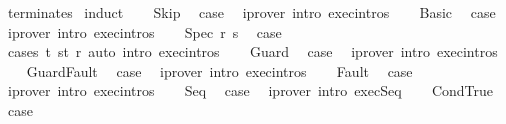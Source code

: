 \begin{isabellebody}
%
\isadelimproof
%
\endisadelimproof
%
\isatagproof
{}\isamarkupfalse%
\ terminates\isanewline
{}\isamarkupfalse%
\ {\isacharparenleft}induct{\isacharparenright}\isanewline
\ \ \isamarkupfalse%
\ Skip\ \isamarkupfalse%
\ {\isacharquery}case\ \isamarkupfalse%
\ {\isacharparenleft}iprover\ intro{\isacharcolon}\ exec{\isachardot}intros{\isacharparenright}\isanewline
{}\isamarkupfalse%
\isanewline
\ \ \isamarkupfalse%
\ Basic\ \isamarkupfalse%
\ {\isacharquery}case\ \isamarkupfalse%
\ {\isacharparenleft}iprover\ intro{\isacharcolon}\ exec{\isachardot}intros{\isacharparenright}\isanewline
{}\isamarkupfalse%
\isanewline
\ \ \isamarkupfalse%
\ {\isacharparenleft}Spec\ r\ s{\isacharparenright}\ \isamarkupfalse%
\ {\isacharquery}case\isanewline
\ \ \ \ \isamarkupfalse%
\ {\isacharparenleft}cases\ {\isachardoublequoteopen}{\isasymexists}t{\isachardot}\ {\isacharparenleft}s{\isacharcomma}t{\isacharparenright}{\isasymin}\ r{\isachardoublequoteclose}{\isacharparenright}\ {\isacharparenleft}auto\ intro{\isacharcolon}\ exec{\isachardot}intros{\isacharparenright}\isanewline
{}\isamarkupfalse%
\isanewline
\ \ \isamarkupfalse%
\ Guard\ \isamarkupfalse%
\ {\isacharquery}case\ \isamarkupfalse%
\ {\isacharparenleft}iprover\ intro{\isacharcolon}\ exec{\isachardot}intros{\isacharparenright}\isanewline
{}\isamarkupfalse%
\isanewline
\ \ \isamarkupfalse%
\ GuardFault\ \isamarkupfalse%
\ {\isacharquery}case\ \isamarkupfalse%
\ {\isacharparenleft}iprover\ intro{\isacharcolon}\ exec{\isachardot}intros{\isacharparenright}\isanewline
{}\isamarkupfalse%
\isanewline
\ \ \isamarkupfalse%
\ Fault\ \isamarkupfalse%
\ {\isacharquery}case\ \isamarkupfalse%
\ {\isacharparenleft}iprover\ intro{\isacharcolon}\ exec{\isachardot}intros{\isacharparenright}\isanewline
{}\isamarkupfalse%
\isanewline
\ \ \isamarkupfalse%
\ Seq\ \isamarkupfalse%
\ {\isacharquery}case\ \isamarkupfalse%
\ {\isacharparenleft}iprover\ intro{\isacharcolon}\ exec{\isacharunderscore}Seq{\isacharprime}{\isacharparenright}\isanewline
{}\isamarkupfalse%
\isanewline
\ \ \isamarkupfalse%
\ CondTrue\ \isamarkupfalse%
\ {\isacharquery}case\ \isamarkupfalse%

\end{isabellebody}
